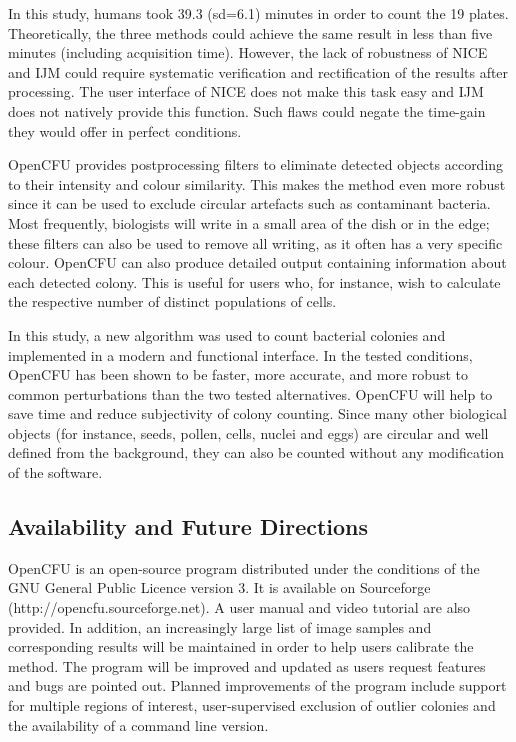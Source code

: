 \documentclass[10pt]{article}
\newcommand{\website}{http://opencfu.sourceforge.net}
\newcommand{\humantime}{39.3 (sd=6.1)}
\newcommand{\IJM}{IJM}
\begin{document}
In this study, humans took \humantime{} minutes in order to count the 19 plates.
Theoretically, the three methods could achieve the same result in less
than five minutes (including acquisition time). However, the lack of robustness of
NICE and \IJM{} could require systematic verification and
rectification of the results after processing. The user interface of NICE does not make this task easy and \IJM{} does not natively
provide this function. Such flaws could negate the time-gain they
would offer in perfect conditions.


OpenCFU provides postprocessing filters to eliminate detected
objects according to their intensity and colour similarity. This makes the method
even more robust since it can be used to exclude circular artefacts such as
contaminant bacteria. Most frequently, biologists will write in a small area of
the dish or in the edge; these filters can also be used to remove all writing, as it often has a very specific colour.
OpenCFU can also produce detailed output containing information about each detected
colony. This is useful for users who, for instance, wish to calculate the
respective number of distinct populations of cells.

In this study, a new algorithm was used to count bacterial colonies and
implemented in a modern and functional interface. In the tested conditions,
OpenCFU has been shown to be faster, more accurate, and
more robust to common perturbations than the two tested alternatives.
OpenCFU will help to save time and reduce subjectivity of colony
counting. Since many other biological objects (for instance, seeds, pollen, cells,
nuclei and eggs) are circular and well defined from the background, they 
can
also be counted without any modification of the software.

\subsection*{Availability and Future Directions}
OpenCFU is an open-source program distributed under the conditions of the GNU
General Public Licence version 3. It is available on Sourceforge (\website{}). A
user manual and video tutorial are also provided. In addition, an increasingly large list
of image samples and corresponding results will be maintained in order 
to 
help users calibrate the method. 
The program will be improved
and updated as users request features and bugs are pointed out.
Planned improvements of the program include support for multiple regions of interest,
user-supervised exclusion of outlier colonies and the availability of 
a command line version.
\end{document}
